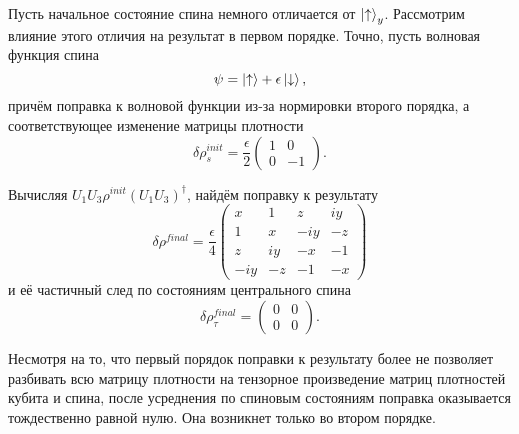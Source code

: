 \documentclass[a4paper,12pt]{article}
\theoremstyle{plain} %
\theoremstyle{definition} %
\theoremstyle{remark} %
\begin{document}
Пусть начальное состояние спина немного отличается от $\ket{\uparrow}_y$. Рассмотрим влияние этого отличия на результат в первом порядке. 
Точно, пусть волновая функция спина
\begin{equation}
    \psi = \ket{\uparrow} + \epsilon \ket{\downarrow},
\end{equation}
причём поправка к волновой функции из-за нормировки второго порядка, а соответствующее изменение матрицы плотности
\begin{equation}
    \delta\rho^{init}_s = \frac{\epsilon}{2}
    \begin{pmatrix}
        1 & 0 \\
        0 & -1 
    \end{pmatrix}.
\end{equation}

Вычисляя $U_1 U_3 \rho^{init} (U_1 U_3)^\dagger$, найдём поправку к результату
\begin{equation}
    \delta \rho^{final} = \frac{\epsilon}{4}
    \begin{pmatrix}
        x & 1 & z & i y \\
        1 & x & - i y & -z \\
        z & i y & -x & -1 \\
        - i y & - z & -1 & -x
    \end{pmatrix}
\end{equation}
и её частичный след по состояниям центрального спина
\begin{equation}
    \delta \rho^{final}_\tau = 
    \begin{pmatrix}
        0 & 0 \\
        0 & 0
    \end{pmatrix}.
\end{equation}

Несмотря на то, что первый порядок поправки к результату более не позволяет разбивать всю матрицу плотности на тензорное произведение матриц плотностей кубита и спина, после усреднения по спиновым состояниям поправка оказывается тождественно равной нулю. Она возникнет только во втором порядке.
\end{document}
